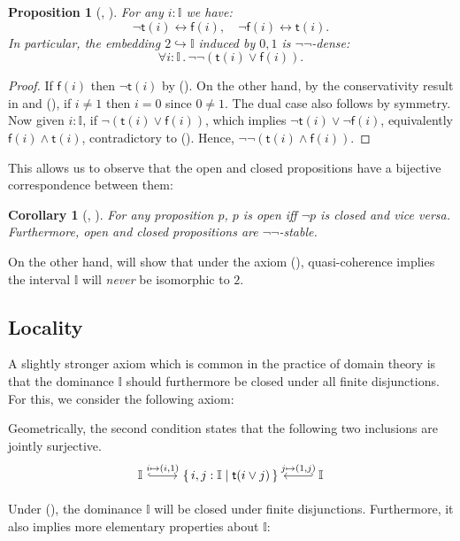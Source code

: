 \documentclass[a4paper,12pt]{amsart}
\newtheorem{corollary}[theorem]{Corollary}
\newtheorem{proposition}[theorem]{Proposition}
\theoremstyle{definition}
\newcommand{\mbb}[1]{\mathbb{#1}}
\newcommand{\I}{\mbb I}
\newcommand{\ms}[1]{\mathsf{#1}}
\newcommand{\scomp}[2]{\{\,#1\mid#2\,\}}
\newcommand{\hook}{\hookrightarrow}
\newcommand{\dneg}{\neg\neg}
\newcommand{\fa}[2]{\forall #1\!\colon\!\!#2\mathpunct{.}}
\newcommand{\eq}{\leftrightarrow}
\newcommand\istsym{\ms{t}}
\newcommand\isfsym{\ms{f}}
\newcommand\ist[1]{\istsym(#1)}
\newcommand\isf[1]{\isfsym(#1)}
\begin{document}
\begin{proposition}[\AxiomNT, \AxiomSQCI]\label{prop:filed}
  For any $i : \I$ we have:
  \[ \neg \ist{i} \eq \isf{i}, \quad \neg\isf{i} \eq \ist{i}\text{.} \]
  In particular, the embedding $2 \hook \I$ induced by $0,1$ is $\neg\neg$-dense:
  \[ \fa i\I \dneg(\ist{i} \vee \isf{i})\text{.} \]
\end{proposition}
\begin{proof}
  If $\isf{i}$ then $\neg\ist{i}$ by (\AxiomNT). On the other hand, by the conservativity result in  and (\AxiomNT), if $i \neq 1$ then $i = 0$ since $0 \neq 1$. The dual case also follows by symmetry. Now given $i :\I$, if $\neg(\ist{i} \vee \isf{i})$, which implies $\neg\ist{i} \vee \neg\isf{i}$, equivalently $\isf{i} \wedge \ist{i}$, contradictory to (\AxiomNT). Hence, $\neg\neg(\ist{i} \wedge \isf{i})$.
\end{proof}

This allows us to observe that the open and closed propositions have a bijective correspondence between them:

\begin{corollary}[\AxiomNT, \AxiomSQCI]\label{cor:opendnegclose}
  For any proposition $p$, $p$ is open iff $\neg p$ is closed and vice versa. Furthermore, open and closed propositions are $\dneg$-stable.
\end{corollary}

On the other hand,  will show that under the axiom (\AxiomNT), quasi-coherence implies the interval $\I$ will \emph{never} be isomorphic to $2$. 

\subsection{Locality}

A slightly stronger axiom which is common in the practice of domain theory is that the dominance $\I$ should furthermore be closed under all finite disjunctions. For this, we consider the following axiom:

\PrintAxiomL

Geometrically, the second condition states that the following two inclusions are jointly surjective. 
  \[ 
  \begin{tikzcd}
    \I \ar[r, hook, "{i \mapsto (i,1)}"] & \scomp{i,j : \I}{\ist{i\vee j}} & \I \ar[l, hook', "{j \mapsto (1,j)}"']
  \end{tikzcd}
  \]

Under (\AxiomL), the dominance $\I$ will be closed under finite disjunctions. Furthermore, it also implies more elementary properties about $\I$:
\end{document}

